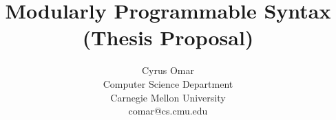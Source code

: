 \documentclass[10pt]{article}
\title{\vspace{-10px}Modularly Programmable   
Syntax \\ (Thesis Proposal)}
\author{Cyrus Omar\\
 Computer Science Department\\
 Carnegie Mellon University\\
 comar@cs.cmu.edu}
\date{}                                           %
\theoremstyle{definition}
\begin{document}
\maketitle

\begin{abstract}


\end{abstract}
\end{document}

